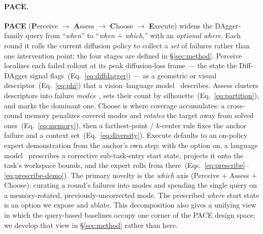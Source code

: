 \documentclass[letterpaper]{article} %
\begin{document}
\paragraph{PACE.}
\textbf{PACE} (\textbf{P}erceive $\to$ \textbf{A}ssess $\to$
\textbf{C}hoose $\to$ \textbf{E}xecute) widens the DAgger-family query from
``\emph{when}'' to ``\emph{when} $+$ \emph{which},'' with an \emph{optional}
\emph{where}. Each round it rolls the current diffusion policy to collect a
\emph{set} of failures rather than one intervention point; the four stages are
defined in \S\ref{sec:method}. Perceive localizes each failed rollout at its
peak diffusion-loss frame --- the state the Diff-DAgger signal
flags~(Eq.~\ref{eq:diffdagger}) --- as a geometric or visual
descriptor~(Eq.~\ref{eq:phi}) that a vision--language
model~\citep{bai2025qwen3vl} describes. Assess clusters descriptors into failure
\emph{modes}~\citep{lloyd1982kmeans}, sets their count by
silhouette~(Eq.~\ref{eq:partition}), and marks the dominant one. Choose is where
coverage accumulates: a cross-round memory penalizes covered modes and
\emph{rotates} the target away from solved ones~(Eq.~\ref{eq:memory}), then a
farthest-point / $k$-center rule fixes the anchor failure and a context
set~(Eq.~\ref{eq:diversity}). Execute defaults to an on-policy expert
demonstration from the anchor's own step; with the option on, a language
model~\citep{yang2025qwen3} prescribes a corrective sub-task-entry start state,
projects it onto the task's workspace bounds, and the expert rolls from
there~(Eqs.~\ref{eq:prescribe}--\ref{eq:prescribe-demo}). The primary novelty is
the \emph{which} axis (Perceive $+$ Assess $+$ Choose): curating a round's
failures into modes and spending the single query on a memory-rotated,
previously-uncorrected mode. The prescribed \emph{where} start state is an option
we expose and ablate. This decomposition also gives a unifying view in which the
query-based baselines occupy one corner of the PACE design space; we develop that
view in \S\ref{sec:method} rather than here.
\end{document}
